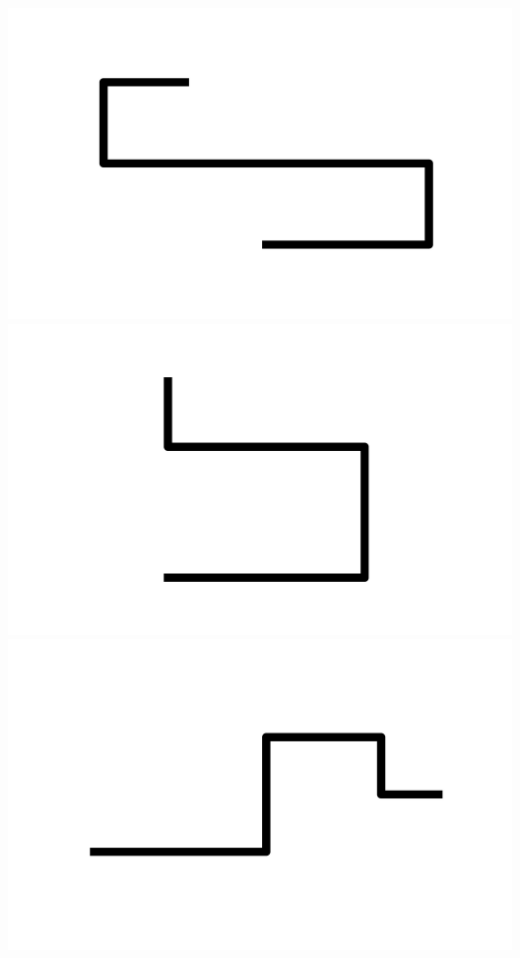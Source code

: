 \documentclass[]{report}
\begin{document}
\includegraphics[scale=.1]{pictures/21/state_cluster_shapes_16.pdf} 
\includegraphics[scale=.1]{pictures/21/state_cluster_shapes_17.pdf} 
\includegraphics[scale=.1]{pictures/21/state_cluster_shapes_18.pdf} 
\end{document}

